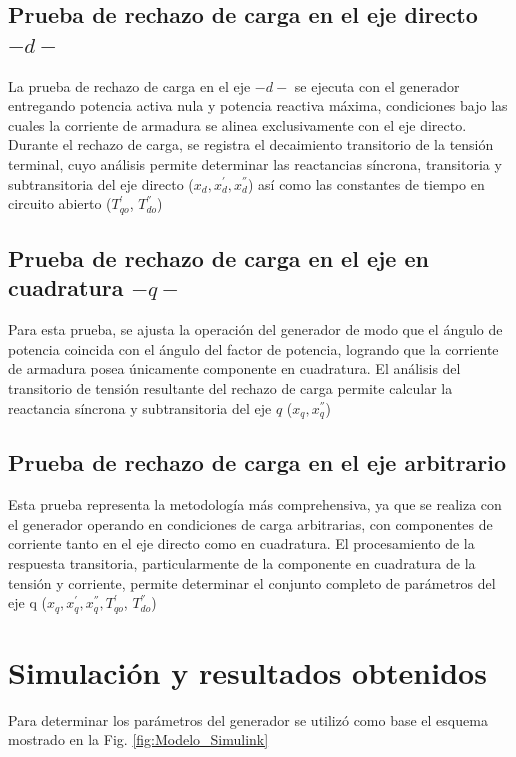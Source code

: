 \documentclass[conference]{IEEEtran}
\begin{document}
\subsection{Prueba de rechazo de carga en el eje directo $-d-$}

La prueba de rechazo de carga en el eje $-d-$ se ejecuta con el generador entregando potencia activa nula y potencia reactiva máxima,
condiciones bajo las cuales la corriente de armadura se alinea exclusivamente con el eje directo.
Durante el rechazo de carga, se registra el decaimiento transitorio de la tensión terminal, cuyo análisis
permite determinar las reactancias síncrona, transitoria y subtransitoria del eje directo ($x_d, x^{'}_d, x^{''}_d$) así como las constantes
de tiempo en circuito abierto ($T^{'}_{qo}$, $T^{''}_{do}$)

\subsection{Prueba de rechazo de carga en el eje en cuadratura $-q-$}

Para esta prueba, se ajusta la operación del generador de modo que el ángulo de potencia coincida con el ángulo del factor de potencia,
logrando que la corriente de armadura posea únicamente componente en cuadratura. El análisis del transitorio de tensión resultante del
rechazo de carga permite calcular la reactancia síncrona y subtransitoria del eje $q$ ($x_q, x^{''}_q$)

\subsection{Prueba de rechazo de carga en el eje arbitrario}

Esta prueba representa la metodología más comprehensiva, ya que se realiza con el generador operando en condiciones de carga arbitrarias,
con componentes de corriente tanto en el eje directo como en cuadratura. El procesamiento de la respuesta transitoria, particularmente de
la componente en cuadratura de la tensión y corriente, permite determinar el conjunto completo de parámetros del eje q 
($x_q, x^{'}_q, x^{''}_q, T^{'}_{qo}$, $T^{''}_{do}$)

\section{Simulación y resultados obtenidos}
Para determinar los parámetros del generador se utilizó como base el esquema mostrado en la Fig. \ref{fig:Modelo_Simulink}
\end{document}
